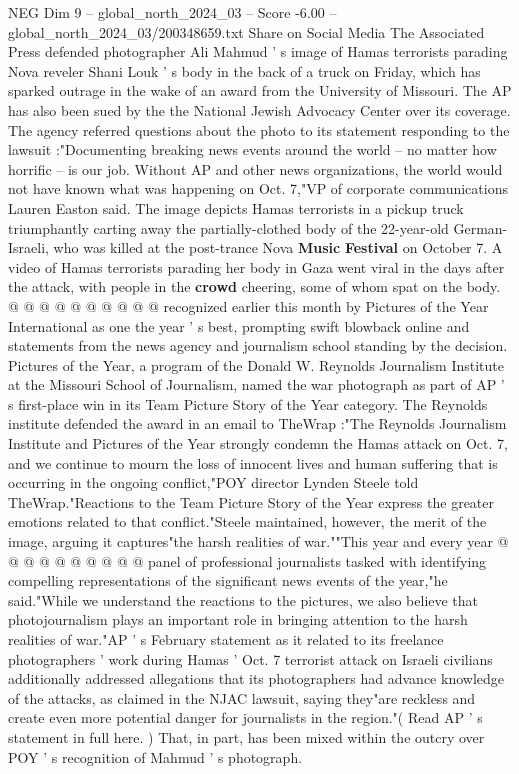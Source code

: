 \begin{textsample}{NEG Dim 9 – global\_north\_2024\_03 – Score -6.00 – global\_north\_2024\_03/200348659.txt}  \label{ex:f9_neg_247}
Share on Social Media The Associated Press defended photographer Ali Mahmud ' s image of Hamas terrorists parading Nova reveler Shani Louk ' s body in the back of a truck on Friday, which has sparked outrage in the wake of an award from the University of Missouri.
The AP has also been sued by the the National Jewish Advocacy Center over its coverage.
The agency referred questions about the photo to its statement responding to the lawsuit :"Documenting breaking news events around the world -- no matter how horrific -- is our job.
Without AP and other news organizations, the world would not have known what was happening on Oct. 7,"VP of corporate communications Lauren Easton said.
The image depicts Hamas terrorists in a pickup truck triumphantly carting away the partially-clothed body of the 22-year-old German-Israeli, who was killed at the post-trance Nova \textbf{Music} \textbf{Festival} on October 7.
A video of Hamas terrorists parading her body in Gaza went viral in the days after the attack, with people in the \textbf{crowd} cheering, some of whom spat on the body. @ @ @ @ @ @ @ @ @ @ recognized earlier this month by Pictures of the Year International as one the year ' s best, prompting swift blowback online and statements from the news agency and journalism school standing by the decision.
Pictures of the Year, a program of the Donald W.
Reynolds Journalism Institute at the Missouri School of Journalism, named the war photograph as part of AP ' s first-place win in its Team Picture Story of the Year category.
The Reynolds institute defended the award in an email to TheWrap :"The Reynolds Journalism Institute and Pictures of the Year strongly condemn the Hamas attack on Oct. 7, and we continue to mourn the loss of innocent lives and human suffering that is occurring in the ongoing conflict,"POY director Lynden Steele told TheWrap."Reactions to the Team Picture Story of the Year express the greater emotions related to that conflict."Steele maintained, however, the merit of the image, arguing it captures"the harsh realities of war.""This year and every year @ @ @ @ @ @ @ @ @ @ panel of professional journalists tasked with identifying compelling representations of the significant news events of the year,"he said."While we understand the reactions to the pictures, we also believe that photojournalism plays an important role in bringing attention to the harsh realities of war."AP ' s February statement as it related to its freelance photographers ' work during Hamas ' Oct. 7 terrorist attack on Israeli civilians additionally addressed allegations that its photographers had advance knowledge of the attacks, as claimed in the NJAC lawsuit, saying they"are reckless and create even more potential danger for journalists in the region."( Read AP ' s statement in full here. ) That, in part, has been mixed within the outcry over POY ' s recognition of Mahmud ' s photograph.

\end{textsample}
